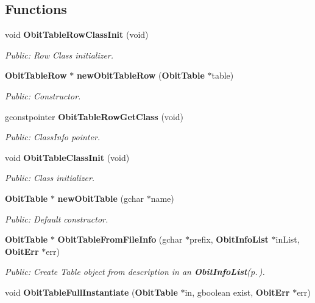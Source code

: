 \subsection*{Functions}
\begin{CompactItemize}
\item 
void {\bf Obit\-Table\-Row\-Class\-Init} (void)
\begin{CompactList}\small\item\em Public: Row Class initializer. \item\end{CompactList}\item 
{\bf Obit\-Table\-Row} $\ast$ {\bf new\-Obit\-Table\-Row} ({\bf Obit\-Table} $\ast$table)
\begin{CompactList}\small\item\em Public: Constructor. \item\end{CompactList}\item 
gconstpointer {\bf Obit\-Table\-Row\-Get\-Class} (void)
\begin{CompactList}\small\item\em Public: Class\-Info pointer. \item\end{CompactList}\item 
void {\bf Obit\-Table\-Class\-Init} (void)
\begin{CompactList}\small\item\em Public: Class initializer. \item\end{CompactList}\item 
{\bf Obit\-Table} $\ast$ {\bf new\-Obit\-Table} (gchar $\ast$name)
\begin{CompactList}\small\item\em Public: Default constructor. \item\end{CompactList}\item 
{\bf Obit\-Table} $\ast$ {\bf Obit\-Table\-From\-File\-Info} (gchar $\ast$prefix, {\bf Obit\-Info\-List} $\ast$in\-List, {\bf Obit\-Err} $\ast$err)
\begin{CompactList}\small\item\em Public: Create Table object from description in an {\bf Obit\-Info\-List}{\rm (p.\,\pageref{structObitInfoList})}. \item\end{CompactList}\item 
void {\bf Obit\-Table\-Full\-Instantiate} ({\bf Obit\-Table} $\ast$in, gboolean exist, {\bf Obit\-Err} $\ast$err)

\end{CompactItemize}
